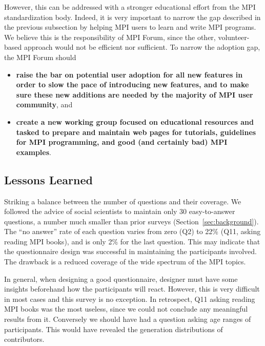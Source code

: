 \documentclass[preprint,5p,times]{elsarticle}
\newcommand{\revision}[2]{{\color{blue}#2}}
\begin{document}
{However, this can be  addressed with a stronger educational effort from the MPI
standardization body. Indeed, it is very important to narrow the gap described in
the previous subsection by helping MPI users to learn and write MPI programs. We
believe this is the responsibility of MPI Forum, since the other,
volunteer-based approach would not be efficient nor sufficient. To narrow the
adoption gap, the MPI Forum should

\begin{itemize}[leftmargin=3ex]
%
\item {\bf raise the bar on potential user adoption for all new features in
order to slow the pace of introducing new features, and to make sure
these new additions are needed by the majority of MPI user community},
  and
%
\item {\bf create a new working group focused on educational resources and
tasked to prepare and maintain web pages for tutorials, guidelines for MPI
programming, and good (and certainly bad) MPI examples}.
\end{itemize}

\revision{}{
  \vspace{3mm}
\subsection{Lessons Learned}

\begin{description}[leftmargin=0cm]

\item[Design Strategy]
Striking a balance between the number of questions and their coverage.
We followed the advice of social scientists to maintain
only 30 easy-to-answer questions, a number much smaller than prior
surveys (Section~\ref{sec:background}).
%
The ``no answer'' rate of each
question varies from zero (Q2) to 22\% (Q11, asking reading MPI
books), and is only 2\% for the last question.
This may indicate that the questionnaire design was successful in
maintaining the participants involved. The drawback is a reduced
coverage of the wide spectrum of the MPI topics.

\item[Questionnaire Design]
In general, when designing a good questionnaire, designer must have
some insights beforehand how the participants will react. However,
this is very difficult in most cases and this survey is no
exception. In retrospect, Q11 asking reading MPI
books was the most useless, since we could not conclude any meaningful
results from it. Conversely we should have had a question asking age
ranges of participants. This would have revealed the generation
distributions of contributors.


\end{description}}}
\end{document}

